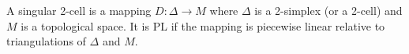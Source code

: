 A singular 2-cell is a mapping $D: \Delta \to M$ where $\Delta$ is a 2-simplex (or a 2-cell) and $M$ is a topological space. It is PL if the mapping is piecewise linear relative to triangulations of $\Delta$ and $M$.
